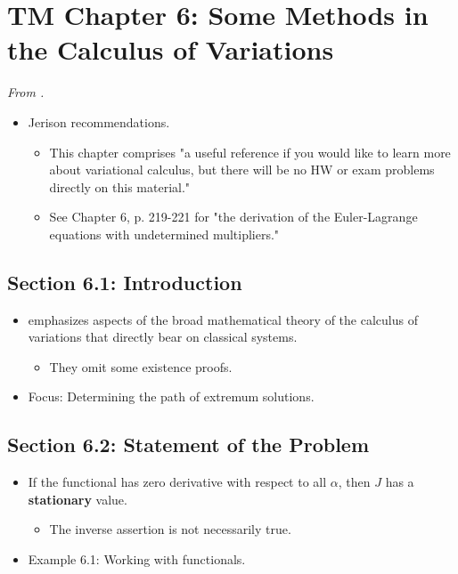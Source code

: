 \documentclass[../notes.tex]{subfiles}
\begin{document}
\section{TM Chapter 6: Some Methods in the Calculus of Variations}
\emph{From \textcite{bib:ThorntonMarion}.}
\begin{itemize}
    \item {}Jerison recommendations.
    \begin{itemize}
        \item This chapter comprises "a useful reference if you would like to learn more about variational calculus, but there will be no HW or exam problems directly on this material."
        \item See Chapter 6, p. 219-221 for "the derivation of the Euler-Lagrange equations with undetermined multipliers."
    \end{itemize}
\end{itemize}


\subsection*{Section 6.1: Introduction}
\begin{itemize}
    \item \textcite{bib:ThorntonMarion} emphasizes aspects of the broad mathematical theory of the calculus of variations that directly bear on classical systems.
    \begin{itemize}
        \item They omit some existence proofs.
    \end{itemize}
    \item Focus: Determining the path of extremum solutions.
\end{itemize}


\subsection*{Section 6.2: Statement of the Problem}
\begin{itemize}
    \item If the functional has zero derivative with respect to all $\alpha$, then $J$ has a \textbf{stationary} value.
    \begin{itemize}
        \item The inverse assertion is not necessarily true.
    \end{itemize}
    \item Example 6.1: Working with functionals.
\end{itemize}
\end{document}
